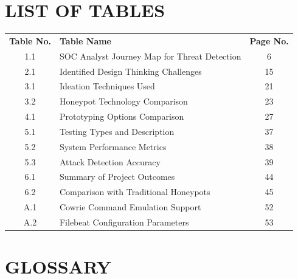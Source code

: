 \documentclass[12pt,a4paper]{report}
\begin{document}
\chapter*{LIST OF TABLES}
\thispagestyle{plain}

\begin{center}
\begin{tabular}{c p{9cm} c}
\textbf{Table No.} & \textbf{Table Name} & \textbf{Page No.} \\[0.3cm]
1.1 & SOC Analyst Journey Map for Threat Detection & 6 \\
2.1 & Identified Design Thinking Challenges & 15 \\
3.1 & Ideation Techniques Used & 21 \\
3.2 & Honeypot Technology Comparison & 23 \\
4.1 & Prototyping Options Comparison & 27 \\
5.1 & Testing Types and Description & 37 \\
5.2 & System Performance Metrics & 38 \\
5.3 & Attack Detection Accuracy & 39 \\
6.1 & Summary of Project Outcomes & 44 \\
6.2 & Comparison with Traditional Honeypots & 45 \\
A.1 & Cowrie Command Emulation Support & 52 \\
A.2 & Filebeat Configuration Parameters & 53 \\
\end{tabular}
\end{center}

\chapter*{GLOSSARY}
\thispagestyle{plain}
\end{document}
